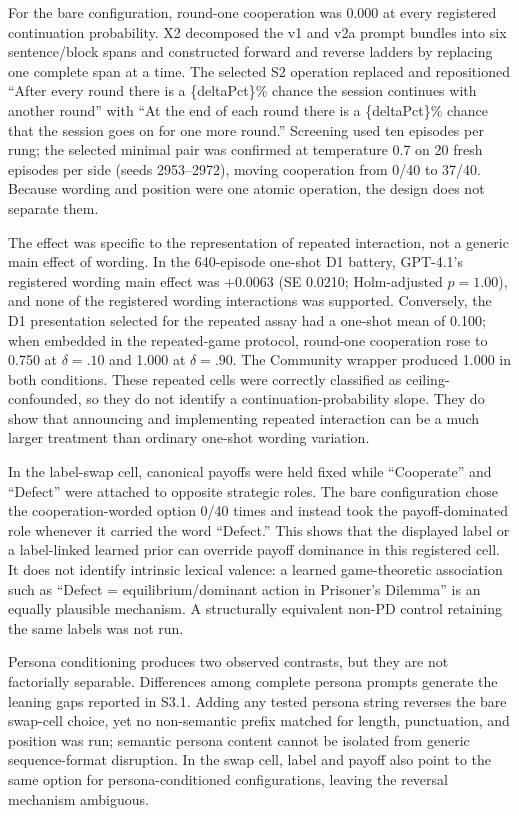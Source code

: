 \documentclass[11pt]{article}
\begin{document}
For the bare configuration, round-one cooperation was 0.000 at every
registered continuation probability. X2 decomposed the v1 and v2a prompt
bundles into six sentence/block spans and constructed forward and
reverse ladders by replacing one complete span at a time. The selected
S2 operation replaced and repositioned ``After every round there is a
\{deltaPct\}\% chance the session continues with another round'' with
``At the end of each round there is a \{deltaPct\}\% chance that the
session goes on for one more round.'' Screening used ten episodes per
rung; the selected minimal pair was confirmed at temperature 0.7 on 20
fresh episodes per side (seeds 2953--2972), moving cooperation from 0/40
to 37/40. Because wording and position were one atomic operation, the
design does not separate them.

The effect was specific to the representation of repeated interaction,
not a generic main effect of wording. In the 640-episode one-shot D1
battery, GPT-4.1's registered wording main effect was +0.0063 (SE
0.0210; Holm-adjusted \(p=1.00\)), and none of the registered wording
interactions was supported. Conversely, the D1 presentation selected for
the repeated assay had a one-shot mean of 0.100; when embedded in the
repeated-game protocol, round-one cooperation rose to 0.750 at
\(\delta=.10\) and 1.000 at \(\delta=.90\). The Community wrapper
produced 1.000 in both conditions. These repeated cells were correctly
classified as ceiling-confounded, so they do not identify a
continuation-probability slope. They do show that announcing and
implementing repeated interaction can be a much larger treatment than
ordinary one-shot wording variation.

In the label-swap cell, canonical payoffs were held fixed while
``Cooperate'' and ``Defect'' were attached to opposite strategic roles.
The bare configuration chose the cooperation-worded option 0/40 times
and instead took the payoff-dominated role whenever it carried the word
``Defect.'' This shows that the displayed label or a label-linked
learned prior can override payoff dominance in this registered cell. It
does not identify intrinsic lexical valence: a learned game-theoretic
association such as ``Defect = equilibrium/dominant action in Prisoner's
Dilemma'' is an equally plausible mechanism. A structurally equivalent
non-PD control retaining the same labels was not run.

Persona conditioning produces two observed contrasts, but they are not
factorially separable. Differences among complete persona prompts
generate the leaning gaps reported in S3.1. Adding any tested persona
string reverses the bare swap-cell choice, yet no non-semantic prefix
matched for length, punctuation, and position was run; semantic persona
content cannot be isolated from generic sequence-format disruption. In
the swap cell, label and payoff also point to the same option for
persona-conditioned configurations, leaving the reversal mechanism
ambiguous.
\end{document}
